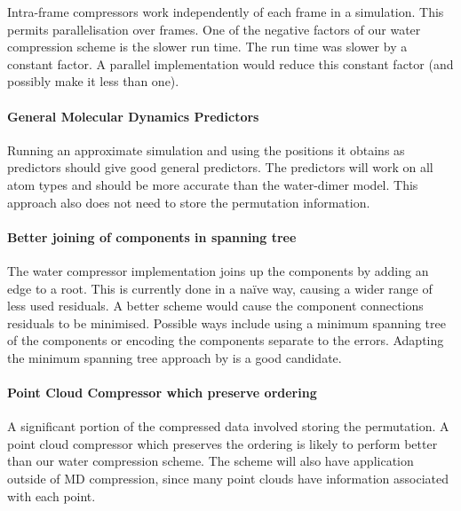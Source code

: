 \documentclass[a4paper]{report}
\begin{document}
Intra-frame compressors work independently of each frame in a simulation. This
permits parallelisation over frames. One of the negative factors of our water
compression scheme is the slower run time. The run time was slower by a
constant factor. A parallel implementation would reduce this constant factor
(and possibly make it less than one).

\paragraph{General Molecular Dynamics Predictors}

Running an approximate simulation and using the positions it obtains as
predictors should give good general predictors. The predictors will work on
all atom types and should be more accurate than the water-dimer model. This
approach also does not need to store the permutation information.

\paragraph{Better joining of components in spanning tree}

The water compressor implementation joins up the components by adding an edge
to a root. This is currently done in a na\"{i}ve way, causing a wider range of
less used residuals. A better scheme would cause the component connections
residuals to be minimised. Possible ways include using a minimum spanning tree
of the components or encoding the components separate to the errors. Adapting
the minimum spanning tree approach by \citet{chen2005lcp} is a good candidate.

\paragraph{Point Cloud Compressor which preserve ordering}

A significant portion of the compressed data involved storing the
permutation. A point cloud compressor which preserves the ordering is likely
to perform better than our water compression scheme. The scheme will also have
application outside of MD compression, since many point clouds have
information associated with each point.

\nocite{*}

\end{document}
